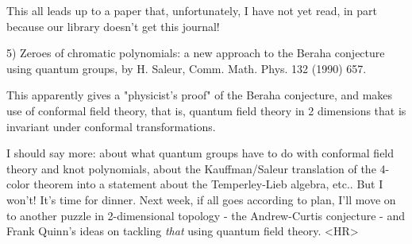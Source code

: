 This all leads up to a paper that, unfortunately, I have not yet read,
in part because our library doesn't get this journal!

5) Zeroes of chromatic polynomials: a new approach to the Beraha
conjecture using quantum groups, by H. Saleur, Comm. Math. Phys. 132
(1990) 657.  

This apparently gives a "physicist's proof" of the Beraha conjecture,
and makes use of conformal field theory, that is, quantum field theory
in 2 dimensions that is invariant under conformal transformations.

I should say more: about what quantum groups have to do with conformal
field theory and knot polynomials, about the Kauffman/Saleur translation
of the 4-color theorem into a statement about the Temperley-Lieb
algebra, etc..  But I won't!  It's time for dinner.  Next week, if all
goes according to plan, I'll move on to another puzzle in 2-dimensional
topology - the Andrew-Curtis conjecture - and Frank Quinn's ideas on
tackling \emph{that} using quantum field theory.
<HR>



